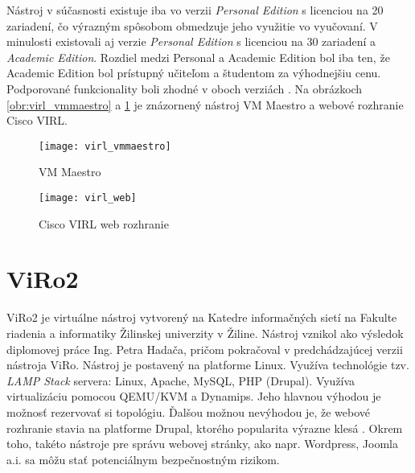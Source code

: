 Nástroj v súčasnosti existuje iba vo verzii \emph{Personal Edition} s licenciou na 20 zariadení, čo výrazným spôsobom obmedzuje jeho využitie vo vyučovaní. V minulosti existovali aj verzie \emph{Personal Edition} s licenciou na 30 zariadení a \emph{Academic Edition}. Rozdiel medzi Personal a Academic Edition bol iba ten, že Academic Edition bol prístupný učiteľom a študentom za výhodnejšiu cenu. Podporované funkcionality boli zhodné v oboch verziách \cite{virl_edition_differences}. Na obrázkoch \ref{obr:virl_vmmaestro} a \ref{obr:virl_web} je znázornený nástroj VM Maestro a webové rozhranie Cisco VIRL.

\begin{figure}
    \centering
    \texttt{[image: virl\_vmmaestro]}
    \caption{VM Maestro} \cite{obr_virl_vmmaestro}
    \label{obr:virl_vmmaestro}

    \vspace{4cm}

    \centering
    \texttt{[image: virl\_web]}
    \caption{Cisco VIRL web rozhranie} \cite{obr_virl_web}
    \label{obr:virl_web}
\end{figure}





\section{ViRo2}

ViRo2 je virtuálne nástroj vytvorený na Katedre informačných sietí na Fakulte riadenia a informatiky Žilinskej univerzity v Žiline. Nástroj vznikol ako výsledok diplomovej práce Ing. Petra Hadača, pričom pokračoval v predchádzajúcej verzii nástroja ViRo. Nástroj je postavený na platforme Linux. Využíva technológie tzv. \emph{LAMP Stack} servera: Linux, Apache, MySQL, PHP (Drupal). Využíva virtualizáciu pomocou QEMU/KVM a Dynamips. Jeho hlavnou výhodou je možnosť rezervovať si topológiu. Ďalšou možnou nevýhodou je, že webové rozhranie stavia na platforme Drupal, ktorého popularita výrazne klesá \cite{stackoverflow_survey}. Okrem toho, takéto nástroje pre správu webovej stránky, ako napr. Wordpress, Joomla a.i. sa môžu stať potenciálnym bezpečnostným rizikom. \cite{incapsula_cms}

